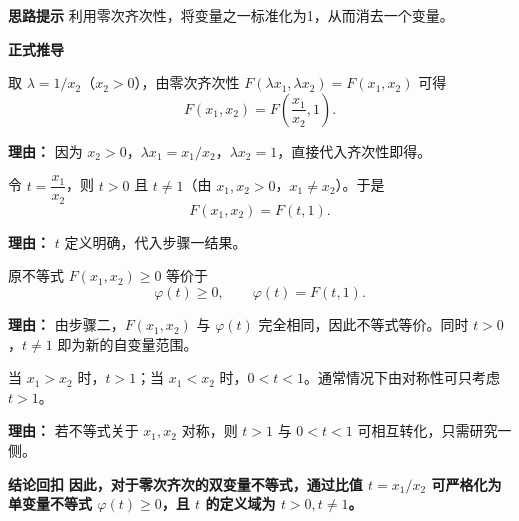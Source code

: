 \begin{proofbox}
	\textbf{\textcolor{CProof}{思路提示}}
	利用零次齐次性，将变量之一标准化为1，从而消去一个变量。

	\medskip
	\textbf{\textcolor{CProof}{正式推导}}
	\begin{description}[style=nextline, leftmargin=2.8em, labelsep=0.5em, itemsep=0.55em]
		\item[\textbf{步骤一（归一化变形）：}]
			取 $\lambda=1/x_2$（$x_2>0$），由零次齐次性 $F(\lambda x_1,\lambda x_2)=F(x_1,x_2)$ 可得
			\[
				F(x_1,x_2)=F\!\left(\frac{x_1}{x_2},1\right)\text{.}
			\]
			\par\textbf{理由：} 因为 $x_2>0$，$\lambda x_1=x_1/x_2$，$\lambda x_2=1$，直接代入齐次性即得。
		\item[\textbf{步骤二（引入比值）：}]
			令 $t=\dfrac{x_1}{x_2}$，则 $t>0$ 且 $t\neq1$（由 $x_1,x_2>0$，$x_1\neq x_2$）。于是
			\[
				F(x_1,x_2)=F(t,1)\text{.}
			\]
			\par\textbf{理由：} $t$ 定义明确，代入步骤一结果。
		\item[\textbf{步骤三（等价转化）：}]
			原不等式 $F(x_1,x_2)\ge0$ 等价于
			\[
				\varphi(t)\ge0,
				\qquad
				\varphi(t)=F(t,1)\text{.}
			\]
			\par\textbf{理由：} 由步骤二，$F(x_1,x_2)$ 与 $\varphi(t)$ 完全相同，因此不等式等价。同时 $t>0$，$t\neq1$ 即为新的自变量范围。
		\item[\textbf{步骤四（实际应用习惯）：}]
			当 $x_1>x_2$ 时，$t>1$；当 $x_1<x_2$ 时，$0<t<1$。通常情况下由对称性可只考虑 $t>1$。
			\par\textbf{理由：} 若不等式关于 $x_1,x_2$ 对称，则 $t>1$ 与 $0<t<1$ 可相互转化，只需研究一侧。
	\end{description}

	\medskip
	\textbf{\textcolor{CProof}{结论回扣}}
	\textbf{因此，对于零次齐次的双变量不等式，通过比值 $t=x_1/x_2$ 可严格化为单变量不等式 $\varphi(t)\ge0$，且 $t$ 的定义域为 $t>0,t\neq1$。}
\end{proofbox}
